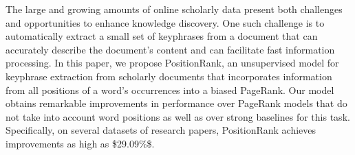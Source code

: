 The large and growing amounts of online scholarly data present both challenges and opportunities to enhance knowledge discovery. One such challenge is to automatically extract a small set of keyphrases from a document that can accurately describe the document's content and can facilitate fast information processing. In this paper, we propose PositionRank, an unsupervised model for keyphrase extraction from scholarly documents that incorporates information from all positions of a word's occurrences into a biased PageRank. Our model obtains remarkable improvements in performance over PageRank models that do not take into account word positions as well as over strong baselines for this task. Specifically, on several datasets of research papers, PositionRank achieves improvements as high as \$29.09\%\$.
